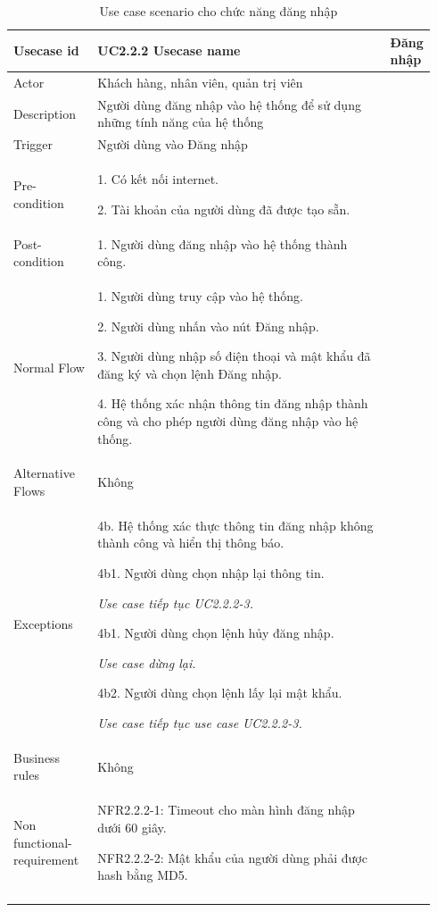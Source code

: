 \begin{longtable}{|>{\hspace{0pt}}m{0.206\linewidth}|>{\hspace{0pt}}m{0.735\linewidth}|} 
\hline
Usecase id & UC2.2.2 \endfirsthead 
\hline
Usecase name & Đăng nhập \\ 
\hline
Actor & Khách hàng, nhân viên, quản trị viên \\ 
\hline
Description & Người dùng đăng nhập vào hệ thống để sử dụng những tính năng của hệ thống \\ 
\hline
Trigger & Người dùng vào Đăng nhập \\ 
\hline
Pre-condition & 1. Có kết nối internet.\par{}2. Tài khoản của người dùng đã được tạo sẵn. \\ 
\hline
Post-condition & 1. Người dùng đăng nhập vào hệ thống thành công. \\ 
\hline
Normal Flow & 1. Người dùng truy cập vào hệ thống.\par{}2. Người dùng nhấn vào nút Đăng nhập.\par{}3. Người dùng nhập số điện thoại và mật khẩu đã đăng ký và chọn lệnh Đăng nhập.\par{}4. Hệ thống xác nhận thông tin đăng nhập thành công và cho phép người dùng đăng nhập vào hệ thống. \\ 
\hline
Alternative Flows & Không \\ 
\hline
Exceptions & 4b. Hệ thống xác thực thông tin đăng nhập không thành công và hiển thị thông báo.\par{}4b1. Người dùng chọn nhập lại thông tin.\par{}\textit{Use case tiếp tục UC2.2.2-3.}\par{}4b1. Người dùng chọn lệnh hủy đăng nhập.\par{}\textit{Use case dừng lại.}\par{}4b2. Người dùng chọn lệnh lấy lại mật khẩu.\par{}\textit{Use case tiếp tục use case UC2.2.2-3.~} \\ 
\hline
Business rules & Không \\ 
\hline
Non functional-requirement & NFR2.2.2-1: Timeout cho màn hình đăng nhập dưới 60 giây.\par{}NFR2.2.2-2: Mật khẩu của người dùng phải được hash bằng MD5. \\ 
\hline
\caption{Use case scenario cho chức năng đăng nhập}
\end{longtable}


